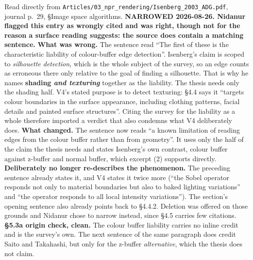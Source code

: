 \documentclass[11pt, a4paper]{article}
\begin{document}
\begin{Form}
  {Read directly from \texttt{\footnotesize Articles/03\_npr\_rendering/Isenberg\_2003\_ADG.pdf}, journal p.~29, \S Image space algorithms. \textbf{NARROWED 2026-08-26. Nidanur flagged this entry as wrongly cited and was right, though not for the reason a surface reading suggests: the source does contain a matching sentence.} \textbf{What was wrong.} The sentence read ``The first of these is the characteristic liability of colour-buffer edge detection''. Isenberg's claim is scoped to \emph{silhouette detection}, which is the whole subject of the survey, so an edge counts as erroneous there only relative to the goal of finding a silhouette. That is why he names \textbf{shading \emph{and texturing}} together as the liability. The thesis needs only the shading half. V4's stated purpose is to detect texturing: \S4.4 says it ``targets colour boundaries in the surface appearance, including clothing patterns, facial details and painted surface structures''. Citing the survey for the liability as a whole therefore imported a verdict that also condemns what V4 deliberately does. \textbf{What changed.} The sentence now reads ``a known limitation of reading edges from the colour buffer rather than from geometry''. It uses only the half of the claim the thesis needs and states Isenberg's own contrast, colour buffer against z-buffer and normal buffer, which excerpt (2) supports directly. \textbf{Deliberately no longer re-describes the phenomenon.} The preceding sentence already states it, and V4 states it twice more (``the Sobel operator responds not only to material boundaries but also to baked lighting variations'' and ``the operator responds to all local intensity variations''). The section's opening sentence also already points back to \S4.4.2. Deletion was offered on those grounds and Nidanur chose to narrow instead, since \S4.5 carries few citations. \textbf{\S5.3a origin check, clean.} The colour buffer liability carries no inline credit and is the survey's own. The next sentence of the same paragraph does credit Saito and Takahashi, but only for the z-buffer \emph{alternative}, which the thesis does not claim.}


\end{Form}
\end{document}
